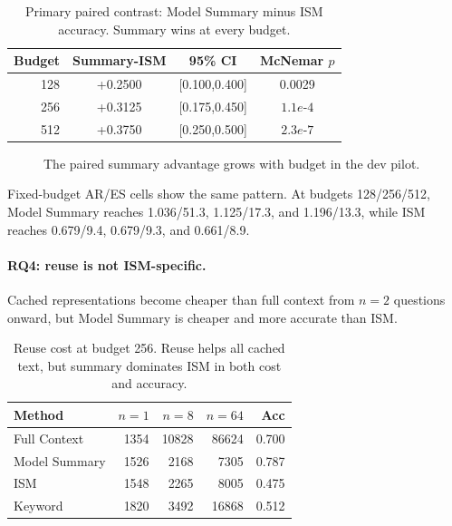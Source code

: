 \documentclass[10pt,twocolumn]{article}
\newcommand{\ism}{\textsc{ISM}}
\newcommand{\ar}{\textsc{AR}}
\newcommand{\es}{\textsc{ES}}
\begin{document}
\begin{table}[t]
\centering
\scriptsize
\begin{tabular}{rccc}
\toprule
Budget & Summary-\ism{} & 95\% CI & McNemar $p$ \\
\midrule
128 & +0.2500 & [0.100,0.400] & 0.0029 \\
256 & +0.3125 & [0.175,0.450] & $1.1e$-$4$ \\
512 & +0.3750 & [0.250,0.500] & $2.3e$-$7$ \\
\bottomrule
\end{tabular}
\caption{Primary paired contrast: Model Summary minus \ism{} accuracy.  Summary
wins at every budget.}
\label{tab:paired}
\end{table}

\begin{figure}[t]
\centering
\scriptsize
{}
\caption{The paired summary advantage grows with budget in the dev pilot.}
\label{fig:summarywins}
\end{figure}

Fixed-budget \ar{}/\es{} cells show the same pattern. At budgets 128/256/512,
Model Summary reaches 1.036/51.3, 1.125/17.3, and 1.196/13.3, while \ism{}
reaches 0.679/9.4, 0.679/9.3, and 0.661/8.9.

\paragraph{RQ4: reuse is not \ism{}-specific.}
Cached representations become cheaper than full context from $n=2$ questions
onward, but Model Summary is cheaper and more accurate than \ism{}.

\begin{table}[t]
\centering
\scriptsize
\begin{tabular}{lrrrr}
\toprule
Method & $n=1$ & $n=8$ & $n=64$ & Acc \\
\midrule
Full Context & 1354 & 10828 & 86624 & 0.700 \\
Model Summary & 1526 & 2168 & 7305 & 0.787 \\
\ism{} & 1548 & 2265 & 8005 & 0.475 \\
Keyword & 1820 & 3492 & 16868 & 0.512 \\
\bottomrule
\end{tabular}
\caption{Reuse cost at budget 256.  Reuse helps all cached text, but summary
dominates \ism{} in both cost and accuracy.}
\label{tab:reuse}
\end{table}
\end{document}
